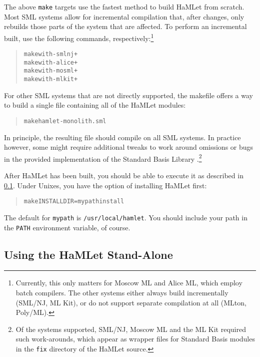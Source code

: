 \documentclass[twoside,titlepage]{article}
\begin{document}
The above {\tt make} targets use the fastest method to build HaMLet from scratch. Most SML systems allow for incremental compilation that, after changes, only rebuilds those parts of the system that are affected. To perform an incremental built, use the following commands, respectively:\footnote{Currently, this only matters for Moscow ML and Alice ML, which employ batch compilers. The other systems either always build incrementally (SML/NJ, ML Kit), or do not support separate compilation at all (MLton, Poly/ML).}

\begin{quote}
\begin{alltt}
make with-smlnj+
make with-alice+
make with-mosml+
make with-mlkit+
\end{alltt}
\end{quote}

For other SML systems that are not directly supported, the makefile offers a way to build a single file containing all of the HaMLet modules:

\begin{quote}
\begin{alltt}
make hamlet-monolith.sml
\end{alltt}
\end{quote}

In principle, the resulting file should compile on all SML systems. In practice however, some might require additional tweaks to work around omissions or bugs in the provided implementation of the Standard Basis Library \cite{basis}.\footnote{Of the systems supported, SML/NJ, Moscow ML and the ML Kit required such work-arounds, which appear as wrapper files for Standard Basis modules in the {\tt fix} directory of the HaMLet source.}

After HaMLet has been built, you should be able to execute it as described in \ref{usingstandalone}. Under Unixes, you have the option of installing HaMLet first:

\begin{quote}
\begin{alltt}
make INSTALLDIR=mypath install
\end{alltt}
\end{quote}

The default for {\tt mypath} is {\tt /usr/local/hamlet}. You should include your path in the {\tt PATH} environment variable, of course.


\subsection{Using the HaMLet Stand-Alone}
\label{usingstandalone}
\end{document}
